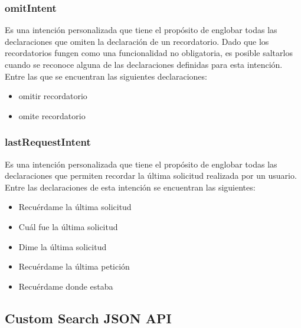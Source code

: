 \subsubsection{omitIntent}
\label{omitIntentcapIV}

Es una intención personalizada que tiene el propósito de englobar todas las declaraciones que omiten la declaración de un recordatorio. Dado que los recordatorios fungen como una funcionalidad no obligatoria, es posible saltarlos cuando se reconoce alguna de las declaraciones definidas para esta intención. Entre las que se encuentran las siguientes declaraciones:

\begin{itemize}
  \item omitir recordatorio
  \item omite recordatorio
\end{itemize}


\subsubsection{lastRequestIntent}
\label{lastRequestIntentcapIV}

Es una intención personalizada que tiene el propósito de englobar todas las declaraciones que permiten recordar la última solicitud realizada por un usuario. Entre las declaraciones de esta intención se encuentran las siguientes:

\begin{itemize}
  \item Recuérdame la última solicitud
  \item Cuál fue la última solicitud
  \item Dime la última solicitud
  \item Recuérdame la última petición
  \item Recuérdame donde estaba
\end{itemize}


\subsection{Custom Search JSON API}
\label{CustomSearchJSONAPIcapIV}

